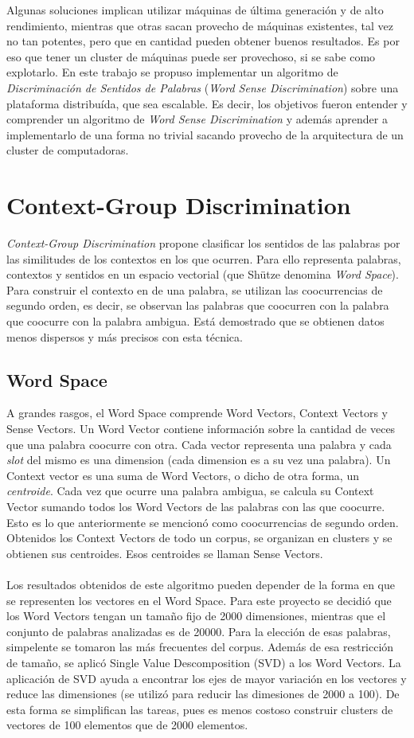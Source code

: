 \documentclass[11pt]{article}
\begin{document}
Algunas soluciones implican utilizar máquinas de última generación y de alto rendimiento, mientras que otras sacan provecho de máquinas existentes, tal vez no tan potentes, pero que en cantidad pueden obtener buenos resultados.
Es por eso que tener un cluster de máquinas puede ser provechoso, si se sabe como explotarlo. En este trabajo se propuso implementar un algoritmo de \emph{Discriminación de Sentidos de Palabras} (\emph{Word Sense Discrimination}) sobre una plataforma distribuída, que sea escalable. Es decir, los objetivos fueron entender y comprender un algoritmo de \emph{Word Sense Discrimination} y además aprender a implementarlo de una forma no trivial sacando provecho de la arquitectura de un cluster de computadoras.

\section{Context-Group Discrimination}
\emph{Context-Group Discrimination} propone clasificar los sentidos de las palabras por las similitudes de los contextos en los que ocurren. Para ello representa palabras, contextos y sentidos en un espacio vectorial (que Shütze denomina \emph{Word Space}). Para construir el contexto en de una palabra, se utilizan las coocurrencias de segundo orden, es decir, se observan las palabras que coocurren con la palabra que coocurre con la palabra ambigua. Está demostrado que se obtienen datos menos dispersos y más precisos con esta técnica.
\subsection{Word Space}
A grandes rasgos, el Word Space comprende Word Vectors, Context Vectors y Sense Vectors.
Un Word Vector contiene información sobre la cantidad de veces que una palabra coocurre con otra. Cada vector representa una palabra y cada \emph{slot} del mismo es una dimension (cada dimension es a su vez una palabra).
Un Context vector es una suma de Word Vectors, o dicho de otra forma, un \emph{centroide}. Cada vez que ocurre una palabra ambigua, se calcula su Context Vector sumando todos los Word Vectors de las palabras con las que coocurre. Esto es lo que anteriormente se mencionó como coocurrencias de segundo orden.
Obtenidos los Context Vectors de todo un corpus, se organizan en clusters y se obtienen sus centroides. Esos centroides se llaman Sense Vectors.
\\
\\
Los resultados obtenidos de este algoritmo pueden depender de la forma en que se representen los vectores en el Word Space. Para este proyecto se decidió que los Word Vectors tengan un tamaño fijo de 2000 dimensiones, mientras que el conjunto de palabras analizadas es de 20000. Para la elección de esas palabras, simpelente se tomaron las más frecuentes del corpus.
Además de esa restricción de tamaño, se aplicó Single Value Descomposition (SVD) a los Word Vectors. La aplicación de SVD ayuda a encontrar los ejes de mayor variación en los vectores y reduce las dimensiones (se utilizó para reducir las dimesiones de 2000 a 100). De esta forma se simplifican las tareas, pues es menos costoso construir clusters de vectores de 100 elementos que de 2000 elementos.
\end{document}

